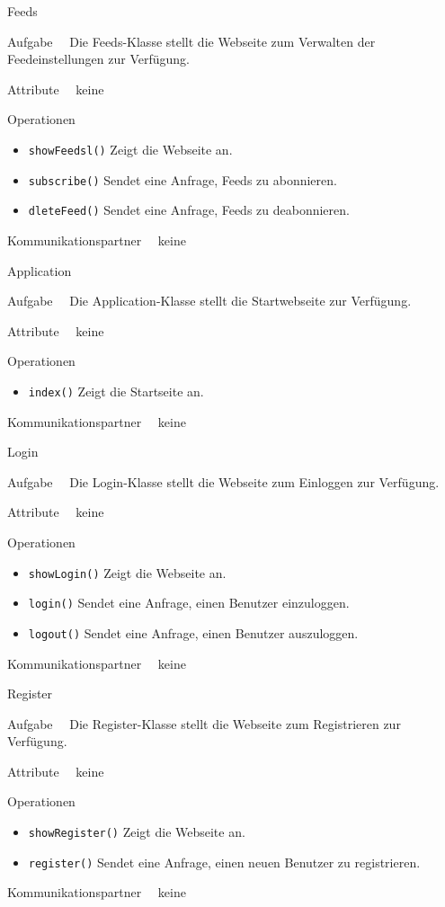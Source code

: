 \begin{class}{60}{Feeds}
\item[Aufgabe]~\
Die Feeds-Klasse stellt die Webseite zum Verwalten der Feedeinstellungen zur Verfügung.
\item[Attribute]~\ keine
\item[Operationen]~\
\begin{itemize}
    \item \texttt{showFeedsl()} Zeigt die Webseite an.
    \item \texttt{subscribe()} Sendet eine Anfrage, Feeds zu abonnieren.
    \item \texttt{dleteFeed()} Sendet eine Anfrage, Feeds zu deabonnieren.
\end{itemize}
\item[Kommunikationspartner]~\ keine
\end{class}

\begin{class}{70}{Application}
\item[Aufgabe]~\
Die Application-Klasse stellt die Startwebseite zur Verfügung.
\item[Attribute]~\ keine
\item[Operationen]~\
\begin{itemize}
    \item \texttt{index()} Zeigt die Startseite an.
\end{itemize}
\item[Kommunikationspartner]~\ keine
\end{class}

\begin{class}{80}{Login}
\item[Aufgabe]~\
Die Login-Klasse stellt die Webseite zum Einloggen zur Verfügung.
\item[Attribute]~\ keine
\item[Operationen]~\
\begin{itemize}
    \item \texttt{showLogin()} Zeigt die Webseite an.
    \item \texttt{login()} Sendet eine Anfrage, einen Benutzer einzuloggen.
    \item \texttt{logout()} Sendet eine Anfrage, einen Benutzer auszuloggen.
\end{itemize}
\item[Kommunikationspartner]~\ keine
\end{class}

\begin{class}{90}{Register}
\item[Aufgabe]~\
Die Register-Klasse stellt die Webseite zum Registrieren zur Verfügung.
\item[Attribute]~\ keine
\item[Operationen]~\
\begin{itemize}
    \item \texttt{showRegister()} Zeigt die Webseite an.
    \item \texttt{register()} Sendet eine Anfrage, einen neuen Benutzer zu registrieren.
\end{itemize}
\item[Kommunikationspartner]~\ keine
\end{class}

